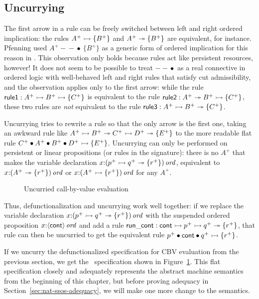 \subsection{Uncurrying}
\label{sec:defunc-uncurry}

The first arrow in a rule can be freely switched between left and right
ordered implication: the rules $A^+
\rightarrowtail \{ B^+ \}$ and $A^+ \twoheadrightarrow \{ B^+ \}$ are equivalent, for instance. 
Pfenning used
\mbox{$A^+ -\!\!\!\!\!-\!\!\!\bullet ~ \{ B^+ \}$} as a generic form of
ordered implication for this reason in
\cite{pfenning04substructural}. This observation only holds because rules act
like persistent resources, however! It does not seem to be possible to
treat \mbox{$-\!\!\!\!\!-\!\!\!\bullet$} as a real connective in
ordered logic with well-behaved left and right rules that satisfy cut
admissibility, and the observation applies only to the first arrow:
while the rule ${\sf rule1} : A^+ \rightarrowtail B^+ \rightarrowtail \{ C^+ \}$ is equivalent
to the rule ${\sf rule2} : A^+ \twoheadrightarrow B^+ \rightarrowtail \{ C^+ \}$, these two
rules are {\it not} equivalent to the rule ${\sf rule3} : A^+ \rightarrowtail
B^+ \twoheadrightarrow \{ C^+ \}$.

Uncurrying tries to rewrite a rule so that the only arrow is the first
one, taking an awkward rule like $A^+ \rightarrowtail B^+ \twoheadrightarrow C^+ \rightarrowtail
D^+ \twoheadrightarrow \{ E^+ \}$ to the more readable flat rule $C^+ \mathbin{\bullet} A^+
\mathbin{\bullet} B^+ \mathbin{\bullet} D^+ \rightarrowtail \{ E^+ \}$. Uncurrying can only be
performed on persistent or linear propositions (or rules in the
signature): there is no $A^+$ that makes
the variable declaration $x{:}{(p^+ \rightarrowtail q^+ \twoheadrightarrow
  \{ r^+ \})}\,{{\it ord}}$, equivalent to 
$x{:}{(A^+ \twoheadrightarrow \{ r^+ \})}\,{{\it ord}}$ or $x{:}{(A^+ \rightarrowtail \{
  r^+ \})}\,{{\it ord}}$ for any $A^+$.

\begin{figure}
\caption{Uncurried call-by-value evaluation}
\label{fig:cbv-uncurry}
\end{figure}

Thus, defunctionalization
and uncurrying work well together: if we replace the variable
declaration
$x{:}{(p^+ \rightarrowtail q^+ \twoheadrightarrow \{ r^+ \})}\,{{\it ord}}$ with the suspended
ordered proposition $x{:}{\langle {\sf cont} \rangle}\,{{\it ord}}$ and add a rule
${\sf run\_cont} : {\sf cont} \rightarrowtail p^+ \rightarrowtail q^+ \twoheadrightarrow \{ r^+ \}$, that rule can 
then be uncurried to get the equivalent rule
$p^+ \mathbin{\bullet} {\sf cont} \mathbin{\bullet} q^+ \rightarrowtail \{ r^+ \}$.

If we uncurry the defunctionalized specification for CBV evaluation
from the previous section, 
we get
the \sls~specification shown in Figure~\ref{fig:cbv-uncurry}. This
flat specification closely and adequately represents the abstract
machine semantics from the beginning of this chapter, but before
proving adequacy in Section~\ref{sec:nat-ssos-adequacy}, we
will make one more change to the semantics.


